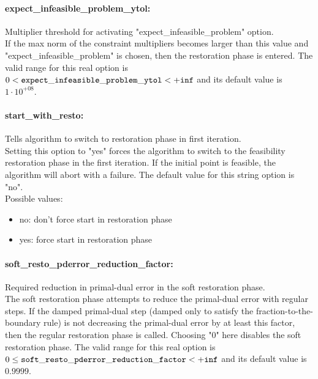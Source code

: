 \paragraph{expect\_infeasible\_problem\_ytol:}\label{sec:expect_infeasible_problem_ytol} Multiplier threshold for activating "expect\_infeasible\_problem" option. $\;$ \\
 If the max norm of the constraint multipliers
becomes larger than this value and
"expect\_infeasible\_problem" is chosen, then the
restoration phase is entered. The valid range for this real option is 
$0 <  {\tt expect\_infeasible\_problem\_ytol } <  {\tt +inf}$
and its default value is $1 \cdot 10^{+08}$.


\paragraph{start\_with\_resto:}\label{sec:start_with_resto} Tells algorithm to switch to restoration phase in first iteration. $\;$ \\
 Setting this option to "yes" forces the algorithm
to switch to the feasibility restoration phase in
the first iteration. If the initial point is
feasible, the algorithm will abort with a failure.
The default value for this string option is "no".
\\ 
Possible values:
\begin{itemize}
   \item no: don't force start in restoration phase
   \item yes: force start in restoration phase
\end{itemize}

\paragraph{soft\_resto\_pderror\_reduction\_factor:}\label{sec:soft_resto_pderror_reduction_factor} Required reduction in primal-dual error in the soft restoration phase. $\;$ \\
 The soft restoration phase attempts to reduce the
primal-dual error with regular steps. If the
damped primal-dual step (damped only to satisfy
the fraction-to-the-boundary rule) is not
decreasing the primal-dual error by at least this
factor, then the regular restoration phase is
called. Choosing "0" here disables the soft
restoration phase. The valid range for this real option is 
$0 \le {\tt soft\_resto\_pderror\_reduction\_factor } <  {\tt +inf}$
and its default value is $0.9999$.


